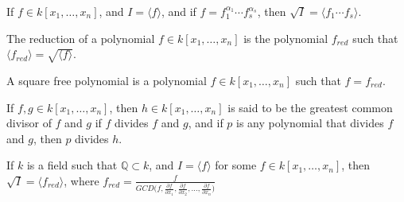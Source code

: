 \documentclass[crop=false,class=article,oneside]{standalone}
\begin{document}
            \begin{theorem}
                If $f\in k[x_1,\hdots ,x_n]$, and
                $I=\langle f\rangle$, and if
                $f=f_1^{\alpha_1}\cdots f_s^{\alpha_s}$,
                then $\sqrt{I}=\langle f_1\cdots f_s\rangle$.
            \end{theorem}
            \begin{definition}
                The reduction of a polynomial
                $f\in k[x_1,\hdots ,x_n]$ is the polynomial
                $f_{red}$ such that
                $\langle f_{red}\rangle=\sqrt{\langle f\rangle}$.
            \end{definition}
            \begin{definition}
                A square free polynomial is a polynomial
                $f\in k[x_1,\hdots ,x_n]$ such that $f=f_{red}$.
            \end{definition}
            \begin{definition}
                If $f,g\in k[x_1,\hdots ,x_n]$, then
                $h\in k[x_1,\hdots ,x_n]$ is said to be the
                greatest common divisor of $f$ and $g$ if $f$
                divides $f$ and $g$, and if $p$ is any polynomial
                that divides $f$ and $g$, then $p$ divides $h$.
            \end{definition}
            \begin{theorem}
                If $k$ is a field such that $\mathbb{Q}\subset k$,
                and $I=\langle f\rangle$ for some
                $f\in k[x_1,\hdots ,x_n]$, then
                $\sqrt{I}=\langle f_{red}\rangle$,
                where
                $f_{red}=\frac{f}{GCD%
                     \big(%
                         f,%
                         \frac{\partial f}{\partial x_1},%
                         \frac{\partial f}{\partial x_2},%
                         \hdots,%
                         \frac{\partial f}{\partial x_n}%
                     \big)}$
            \end{theorem}
\end{document}
